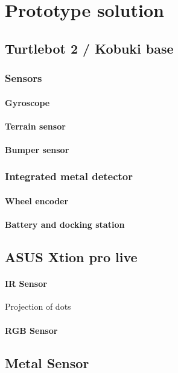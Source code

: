 \chapter{Prototype solution}

\section{Turtlebot 2 / Kobuki base}

\subsection{Sensors}
\subsubsection*{Gyroscope}
\subsubsection*{Terrain sensor}
\subsubsection*{Bumper sensor}
\subsection{Integrated metal detector}
\subsubsection*{Wheel encoder}
\subsubsection*{Battery and docking station}
\section*{ASUS Xtion pro live}
\subsubsection*{IR Sensor}
Projection of dots
\subsubsection*{RGB Sensor}
\section*{Metal Sensor}




